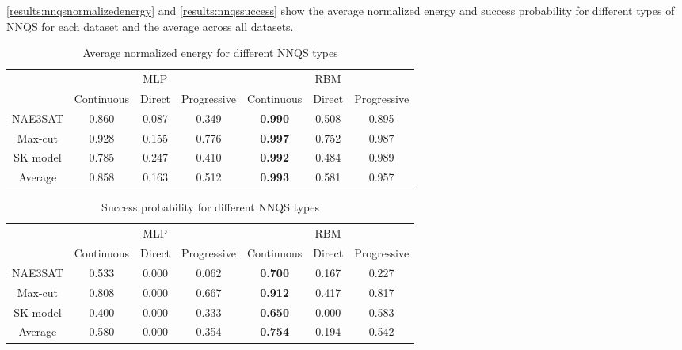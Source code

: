 \autoref{results:nnqsnormalizedenergy} and \autoref{results:nnqssuccess} show the average normalized energy and success probability for different types of NNQS for each dataset and the average across all datasets.

\begin{table}[!ht]
    \centering
    \begin{tabular}{ccccccc} \toprule
        ~ & \multicolumn{3}{c}{MLP} & \multicolumn{3}{c}{RBM} \\
        \cmidrule{2-7} & Continuous & Direct & Progressive & Continuous & Direct & Progressive \\
        \midrule
        NAE3SAT & 0.860 & 0.087 & 0.349 & \textbf{0.990} & 0.508 & 0.895 \\
        Max-cut & 0.928 & 0.155 & 0.776 & \textbf{0.997} & 0.752 & 0.987 \\
        SK model & 0.785 & 0.247 & 0.410 & \textbf{0.992} & 0.484 & 0.989 \\ \midrule
        Average & 0.858 & 0.163 & 0.512 & \textbf{0.993} & 0.581 & 0.957 \\ \bottomrule
    \end{tabular}
    \caption{Average normalized energy for different NNQS types}
    \label{results:nnqsnormalizedenergy}
\end{table}

\begin{table}[!ht]
    \centering
    \begin{tabular}{ccccccc} \toprule
        ~ & \multicolumn{3}{c}{MLP} & \multicolumn{3}{c}{RBM} \\
        \cmidrule{2-7} & Continuous & Direct & Progressive & Continuous & Direct & Progressive \\
        \midrule
        NAE3SAT & 0.533 & 0.000 & 0.062 & \textbf{0.700} & 0.167 & 0.227 \\
        Max-cut & 0.808 & 0.000 & 0.667 & \textbf{0.912} & 0.417 & 0.817 \\
        SK model & 0.400 & 0.000 & 0.333 & \textbf{0.650} & 0.000 & 0.583 \\ \midrule
        Average & 0.580 & 0.000 & 0.354 & \textbf{0.754} & 0.194 & 0.542 \\ \bottomrule
    \end{tabular}
    \caption{Success probability for different NNQS types}
    \label{results:nnqssuccess}
\end{table}